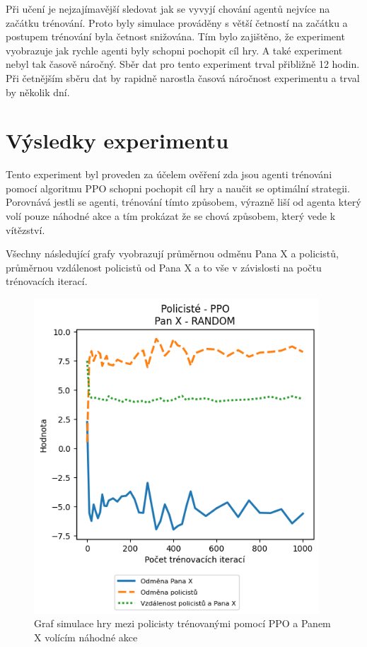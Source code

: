 Při učení je nejzajímavější sledovat jak se vyvyjí chování agentů nejvíce na začátku trénování.
Proto byly simulace prováděny s větší četností na začátku a postupem trénování byla četnost snižována.
Tím bylo zajištěno, že experiment vyobrazuje jak rychle agenti byly schopni pochopit cíl hry.
A také experiment nebyl tak časově náročný.
Sběr dat pro tento experiment trval přibližně 12 hodin.
Při četnějším sběru dat by rapidně narostla časová náročnost experimentu a trval by několik dní.

\section{Výsledky experimentu}
\label{sec:experiment-1}

Tento experiment byl proveden za účelem ověření zda jsou agenti trénováni pomocí algoritmu PPO schopni pochopit cíl hry a naučit se optimální strategii.
Porovnává jestli se agenti, trénování tímto způsobem, výrazně liší od agenta který volí pouze náhodné akce a tím prokázat že se chová způsobem, který vede k vítězství.

Všechny následující grafy vyobrazují průměrnou odměnu Pana X a policistů, průměrnou vzdálenost policistů od Pana X a to vše v závislosti na počtu trénovacích iterací.

\begin{figure}[H]\label{fig:cop_ppo_mrx_random}
	\centering
	\includegraphics[width=0.95\textwidth]{obrazky-figures/graphs/cop_PPO_mrx_RANDOM.png}
	\caption{Graf simulace hry mezi policisty trénovanými pomocí PPO a Panem X volícím náhodné akce}
\end{figure}

